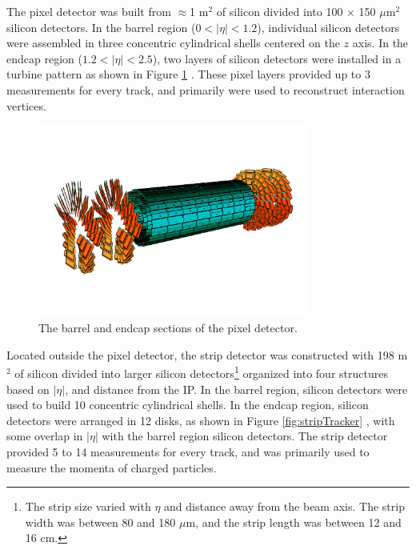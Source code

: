 The pixel detector was built from $\approx$1 m$^{2}$ of silicon divided into 100 $\times$ 150 $\mu$m$^{2}$ silicon detectors.  
In the barrel region ($0 < |\eta| < 1.2$), individual silicon detectors were assembled in three concentric cylindrical shells 
centered on the $z$ axis.  In the endcap region ($1.2 < |\eta| < 2.5$), two layers of silicon detectors were 
installed in a turbine pattern as shown in Figure \ref{fig:pixelTracker} \cite{pixelCommissioning}.  These pixel 
layers provided up to 3 measurements for every track, and primarily were used to reconstruct interaction 
vertices.

\begin{figure}[ht]
	\centering
	\includegraphics[width=0.8\textwidth]{figures/pixelDetectorSchematic.png}
	\caption{The barrel and endcap sections of the pixel detector.}
	\label{fig:pixelTracker}
\end{figure}

Located outside the pixel detector, the strip detector was constructed with 198 m$^{2}$ of silicon divided into larger silicon detectors\footnote{The strip size varied with $\eta$ and 
distance away from the beam axis.  The strip width was between 80 and 180 $\mu$m, and the strip length was between 12 and 16 cm.} organized 
into four structures based on $|\eta|$, and distance from the IP.  In the barrel region, silicon detectors 
were used to build 10 concentric cylindrical shells.  In the endcap region, silicon detectors 
were arranged in 12 disks, as shown in Figure \ref{fig:stripTracker} \cite{cmsTDR}, with some overlap in $|\eta|$ with the 
barrel region silicon detectors.  The strip detector provided 5 to 14 measurements for every track, and was primarily used to 
measure the momenta of charged particles.

